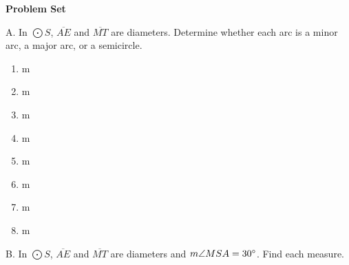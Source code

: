 \textbf{Problem Set}

\vspce

A. In $\bigodot S$, $\overline{AE} $ and $\overline{MT} $ are diameters. Determine whether each arc is a minor arc, a major arc, or a semicircle. 
\begin{enumerate}[label = \arabic*. ]
\item \hspce m
\item \hspce m
\item \hspce m    
\item \hspce m \hspace*{5cm}
\item \hspce m
\item \hspce m
\item \hspce m
\item \hspce m
\end{enumerate}  


B. In $\bigodot S$, $\overline{AE} $ and $\overline{MT} $ are diameters and $m \angle{MSA} = 30 \degree $. Find each measure. 

 